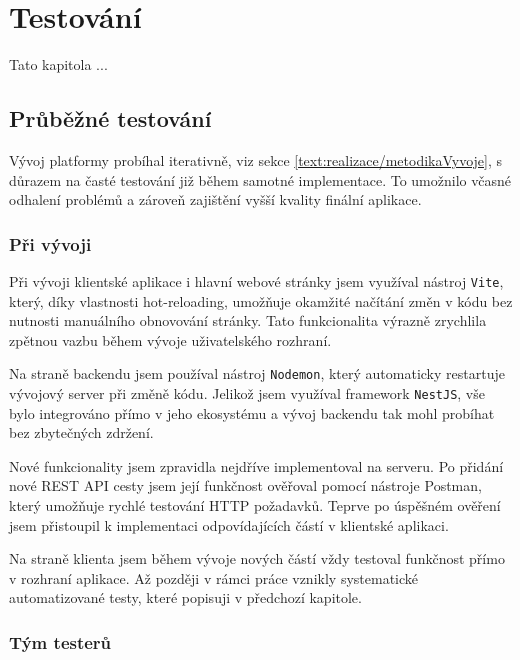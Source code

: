 \chapter{Testování}\label{text:testovani}


\begin{chapterabstract}
Tato kapitola ...
\end{chapterabstract}

\section{Průběžné testování}\label{text:testovani/prubezne}

Vývoj platformy probíhal iterativně, viz sekce \ref{text:realizace/metodikaVyvoje}, s důrazem na časté testování již během samotné implementace.
To umožnilo včasné odhalení problémů a zároveň zajištění vyšší kvality finální aplikace.

\subsection{Při vývoji}

Při vývoji klientské aplikace i hlavní webové stránky jsem využíval nástroj \texttt{Vite}, který, díky vlastnosti hot-reloading, umožňuje okamžité načítání změn v kódu bez nutnosti manuálního obnovování stránky.
Tato funkcionalita výrazně zrychlila zpětnou vazbu během vývoje uživatelského rozhraní.

Na straně backendu jsem používal nástroj \texttt{Nodemon}, který automaticky restartuje vývojový server při změně kódu. 
Jelikož jsem využíval framework \texttt{NestJS}, vše bylo integrováno přímo v jeho ekosystému a vývoj backendu tak mohl probíhat bez zbytečných zdržení.

Nové funkcionality jsem zpravidla nejdříve implementoval na serveru.
Po přidání nové REST API cesty jsem její funkčnost ověřoval pomocí nástroje Postman, který umožňuje rychlé testování HTTP požadavků.
Teprve po úspěšném ověření jsem přistoupil k implementaci odpovídajících částí v klientské aplikaci.

Na straně klienta jsem během vývoje nových částí vždy testoval funkčnost přímo v rozhraní aplikace.
Až později v rámci práce vznikly systematické automatizované testy, které popisuji v předchozí kapitole.

\subsection{Tým testerů}

